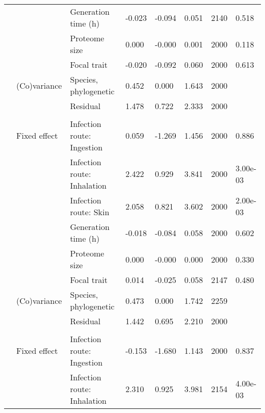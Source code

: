 \begin{table}
\begin{tabular}[t]{llllllll}
\hspace{1em} &  & Generation time (h) & -0.023 & -0.094 & 0.051 & 2140 & 0.518\\
\hspace{1em} &  & Proteome size & 0.000 & -0.000 & 0.001 & 2000 & 0.118\\
\hspace{1em} &  & Focal trait & -0.020 & -0.092 & 0.060 & 2000 & 0.613\\
\hspace{1em} & (Co)variance & Species, phylogenetic & 0.452 & 0.000 & 1.643 & 2000 & \\
\hspace{1em} &  & Residual & 1.478 & 0.722 & 2.333 & 2000 & \\
\addlinespace[0.3em]
\multicolumn{8}{l}{\textbf{Secretion systems}}\\
\hspace{1em} & Fixed effect & Infection route: Ingestion & 0.059 & -1.269 & 1.456 & 2000 & 0.886\\
\hspace{1em} &  & Infection route: Inhalation & 2.422 & 0.929 & 3.841 & 2000 & 3.00e-03\\
\hspace{1em} &  & Infection route: Skin & 2.058 & 0.821 & 3.602 & 2000 & 2.00e-03\\
\hspace{1em} &  & Generation time (h) & -0.018 & -0.084 & 0.058 & 2000 & 0.602\\
\hspace{1em} &  & Proteome size & 0.000 & -0.000 & 0.000 & 2000 & 0.330\\
\hspace{1em} &  & Focal trait & 0.014 & -0.025 & 0.058 & 2147 & 0.480\\
\hspace{1em} & (Co)variance & Species, phylogenetic & 0.473 & 0.000 & 1.742 & 2259 & \\
\hspace{1em} &  & Residual & 1.442 & 0.695 & 2.210 & 2000 & \\
\addlinespace[0.3em]
\multicolumn{8}{l}{\textbf{Virulence factors}}\\
\hspace{1em} & Fixed effect & Infection route: Ingestion & -0.153 & -1.680 & 1.143 & 2000 & 0.837\\
\hspace{1em} &  & Infection route: Inhalation & 2.310 & 0.925 & 3.981 & 2154 & 4.00e-03\\

\end{tabular}
\end{table}
